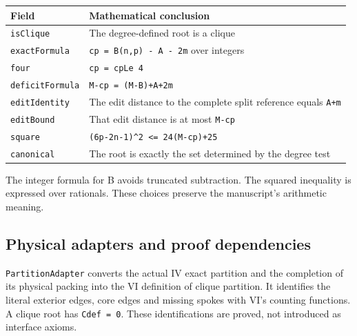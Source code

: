 \documentclass[english,11pt,a4paper]{article}
\newcounter{none}
\begin{document}
{\def\LTcaptype{none} %
\begin{longtable}[]{@{}
  >{\raggedright\arraybackslash}p{}
  >{\raggedright\arraybackslash}p{}@{}}
\toprule\noalign{}
\begin{minipage}[b]{\linewidth}\raggedright
Field
\end{minipage} & \begin{minipage}[b]{\linewidth}\raggedright
Mathematical conclusion
\end{minipage} \\
\midrule\noalign{}
\endhead
\bottomrule\noalign{}
\endlastfoot
\nolinkurl{isClique} & The degree-defined root is a clique \\
\nolinkurl{exactFormula} & \texttt{cp\ =\ B(n,p)\ -\ A\ -\ 2m} over
integers \\
\nolinkurl{four} & \texttt{cp\ =\ cpLe\ 4} \\
\nolinkurl{deficitFormula} & \texttt{M-cp\ =\ (M-B)+A+2m} \\
\nolinkurl{editIdentity} & The edit distance to the complete split
reference equals \nolinkurl{A+m} \\
\nolinkurl{editBound} & That edit distance is at most \nolinkurl{M-cp} \\
\nolinkurl{square} & \texttt{(6p-2n-1)\^{}2\ \textless{}=\ 24(M-cp)+25} \\
\nolinkurl{canonical} & The root is exactly the set determined by the
degree test \\
\end{longtable}
}

The integer formula for B avoids truncated subtraction. The squared
inequality is expressed over rationals. These choices preserve the
manuscript's arithmetic meaning.

\subsection{Physical adapters and proof
dependencies}\label{physical-adapters-and-proof-dependencies}

\nolinkurl{PartitionAdapter} converts the actual IV exact partition and the
completion of its physical packing into the VI definition of clique
partition. It identifies the literal exterior edges, core edges and
missing spokes with VI's counting functions. A clique root has
\texttt{Cdef\ =\ 0}. These identifications are proved, not introduced as
interface axioms.
\end{document}
